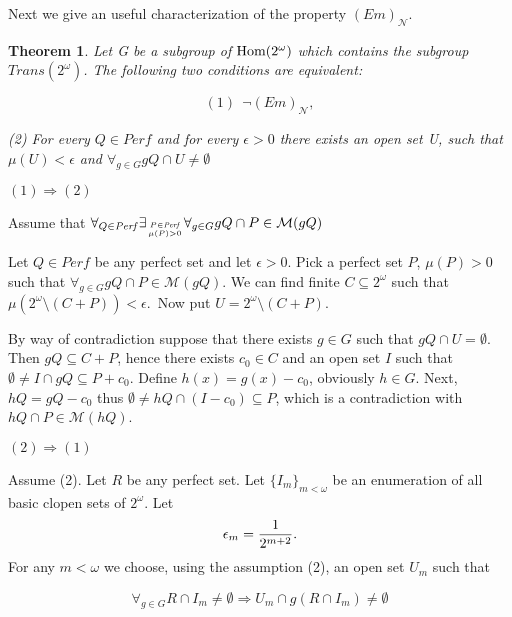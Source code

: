 \documentclass[b5cutpaper, twoside, 11pt, leqno]{moravica}
\newcommand{\eps}{\epsilon}
\newcommand\trans{\mathit{Trans}(\ca)}
\newcommand\ooo{\underline{O}}
\newcommand{\seq}{\subseteq}
\newcommand{\ca}{2^{\omega}}
\newcommand{\mgr}{\mathcal{M}}
\newcommand{\neglig}{\mathcal{N}}
\newcommand{\perf}{\mathit{Perf}}
\newcommand{\cantor}{\ca}
\newcommand\Hom{{\rm Hom(\ca)}}
\newtheorem{theorem}{Theorem}[section]
\theoremstyle{definition}
\begin{document}
 
  Next we give an useful characterization of the
property $(Em)_{\neglig}$.

\medskip

\begin{theorem}
Let G be a subgroup of $\Hom$ which contains the
subgroup $\trans$. The following two conditions are
equivalent:

\[ (1)\ \ \neg (Em)_{\neglig}, \]

\par (2) For every $Q \in \perf$
and for every $\eps > 0$ there exists an open
set U, such that
$\mu(U) < \eps$
and $\forall_{g \in G} gQ \cap U \not = \emptyset$
\end{theorem}

\proof

$(1) \Rightarrow (2)$
\par
Assume that
$\forall_{Q \in \perf} \exists_{P \in \perf \atop \mu(P) > 0}
\forall_{g \in G} gQ \cap P \in \mgr(gQ)$

Let $Q \in \perf$ be any perfect set and let $\eps > 0$.
Pick a perfect set $P$, $\mu(P) > 0$ such
that $\forall_{g \in G} gQ \cap P \in \mgr(gQ)$.
We can find finite $C \seq \cantor$ such that
$\mu(\cantor \setminus (C+P)) < \eps$.\
Now put $U = \cantor \setminus (C+P)$.

By way of contradiction suppose that
there exists $g \in G$ such that
$gQ \cap U = \emptyset$.
Then $gQ \seq C + P$, hence
there exists $c_0 \in C$ and an open set $I$
such that $\emptyset \not = I \cap gQ \seq P + c_0$.
  Define $h(x) = g(x) - c_0$, obviously $h \in G$.
Next, $hQ = gQ - c_0$ thus
$\emptyset \not = hQ \cap (I - c_0) \seq P$,
which is a contradiction with
$hQ \cap P \in \mgr(hQ)$.


\medskip

$(2) \Rightarrow (1)$

Assume (2). Let $R$ be any perfect
set. Let $\{ I_m \} _{m < \omega}$
be an enumeration of all basic clopen sets of $\cantor$.
Let
  \[\eps_{m} = {1 \over 2^{m + 2}}.\]
For any $m < \omega$
we choose, using the assumption (2),
an open set $U_{m}$ such that

\[
\forall_{g\in G} R \cap I_m \not = \emptyset
\Rightarrow U_{m} \cap g(R \cap I_m) \not = \emptyset
\]
\end{document}
